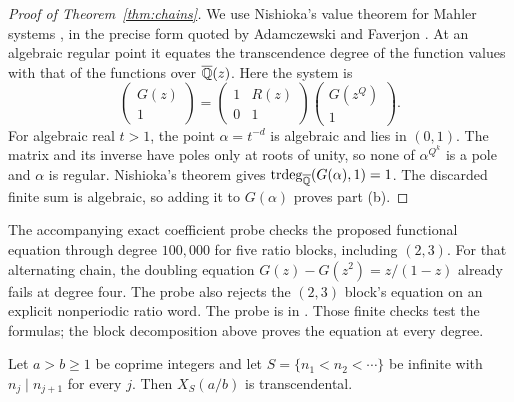 \documentclass[11pt]{article}
\begin{document}
\begin{proof}[Proof of Theorem~\ref{thm:chains}]
We use Nishioka's value theorem for Mahler systems
\cite{nishioka1996}, in the precise form quoted by Adamczewski and Faverjon
\cite[Theorem~1.1, p.~3]{adamczewskifaverjon2016}.  At an algebraic regular
point it equates the transcendence degree of the function values with that
of the functions over $\overline{\mathbb{Q}}(z)$.  Here the system is
\[
 \begin{pmatrix}G(z)\\1\end{pmatrix}
 =\begin{pmatrix}1&R(z)\\0&1\end{pmatrix}
  \begin{pmatrix}G(z^Q)\\1\end{pmatrix}.
\]
For algebraic real $t>1$, the point $\alpha=t^{-d}$ is algebraic and lies
in $(0,1)$. The matrix and its inverse have poles only at roots of unity,
so none of $\alpha^{Q^k}$ is a pole and $\alpha$ is regular.
Nishioka's theorem gives
$\operatorname{trdeg}_{\overline{\mathbb{Q}}}(G(\alpha),1)=1$.
The discarded finite sum is algebraic, so adding it to $G(\alpha)$
proves part (b).
\end{proof}

The accompanying exact coefficient probe checks the proposed functional
equation through degree $100{,}000$ for five ratio blocks, including $(2,3)$.
For that alternating chain, the doubling equation
$G(z)-G(z^2)=z/(1-z)$ already fails at degree four.
The probe also rejects the $(2,3)$ block's equation on an explicit
nonperiodic ratio word.
The probe is in
\href{https://github.com/wcook04/plectis-erdos/blob/01de6282/research/experiments/interestingness/periodic_chain_probe.py}
{}.
Those finite checks test the formulas; the block decomposition above proves
the equation at every degree.

\begin{theorem}\label{thm:chain-transcendence}
Let $a>b\ge1$ be coprime integers and let $S=\{n_1<n_2<\cdots\}$ be infinite
with $n_j\mid n_{j+1}$ for every $j$. Then $X_S(a/b)$ is transcendental.
\end{theorem}
\end{document}
